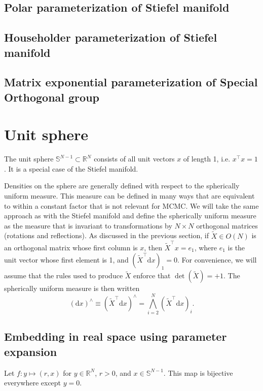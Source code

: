 \documentclass[11pt]{article}
\newcommand{\dv}[1]{\mathrm{d}{#1}}
\begin{document}
\subsection{Polar parameterization of Stiefel manifold}

\subsection{Householder parameterization of Stiefel manifold}

\subsection{Matrix exponential parameterization of Special Orthogonal group}

\section{Unit sphere}

The unit sphere $\mathbb{S}^{N-1} \subset \mathbb{R}^N$ consists of all unit vectors $x$ of length 1, i.e. $x^\top x = 1$.
It is a special case of the Stiefel manifold.

Densities on the sphere are generally defined with respect to the spherically uniform measure.
This measure can be defined in many ways that are equivalent to within a constant factor that is not relevant for MCMC.
We will take the same approach as with the Stiefel manifold and define the spherically uniform measure as the measure that is invariant to transformations by $N \times N$ orthogonal matrices (rotations and reflections).
As discussed in the previous section, if $\tilde{X} \in O(N)$ is an orthogonal matrix whose first column is $x$, then $\tilde{X}^\top x = e_1$, where $e_1$ is the unit vector whose first element is 1, and $(\tilde{X}^\top \dv{x})_1 = 0$.
For convenience, we will assume that the rules used to produce $\tilde{X}$ enforce that $\det(\tilde{X}) = +1$.
The spherically uniform measure is then written
\[
    (\dv{x})^\wedge \equiv (\tilde{X}^\top \dv{x})^\wedge = \bigwedge_{i=2}^N (\tilde{X}^\top \dv{x})_i.
\]

\subsection{Embedding in real space using parameter expansion}

Let $f\colon y \mapsto (r, x)$ for $y \in \mathbb{R}^N$, $r > 0$, and $x \in \mathbb{S}^{N-1}$.
This map is bijective everywhere except $y=0$.
\end{document}
